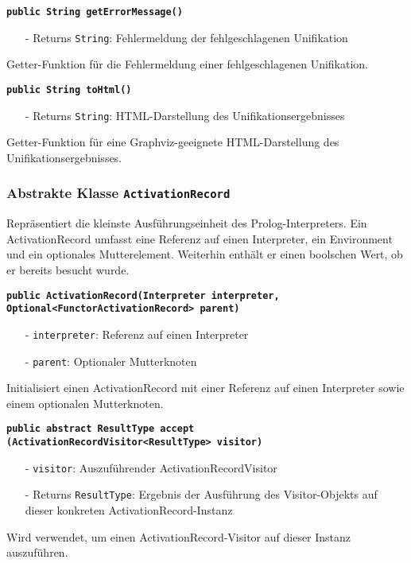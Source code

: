 \documentclass[parskip=full,11pt,twoside]{scrartcl}
\begin{document}
\textbf{\texttt{public String getErrorMessage()}}
\begin{itemize}[noitemsep]
	\item[-] Returns \texttt{String}: Fehlermeldung der fehlgeschlagenen Unifikation
\end{itemize}
Getter-Funktion für die Fehlermeldung einer fehlgeschlagenen Unifikation.

\textbf{\texttt{public String toHtml()}}
\begin{itemize}[noitemsep]
	\item[-] Returns \texttt{String}: HTML-Darstellung des Unifikationsergebnisses
\end{itemize}
Getter-Funktion für eine Graphviz-geeignete HTML-Darstellung des Unifikationsergebnisses.

\subsubsection{Abstrakte Klasse \texttt{ActivationRecord}}
Repräsentiert die kleinste Ausführungseinheit des Prolog-Interpreters. Ein ActivationRecord umfasst eine Referenz auf einen Interpreter, ein Environment und ein optionales Mutterelement. Weiterhin enthält er einen boolschen Wert, ob er bereits besucht wurde.

\textbf{\texttt{public ActivationRecord(Interpreter interpreter,\\Optional<FunctorActivationRecord> parent)}}
\begin{itemize}[noitemsep]
	\item[-] \texttt{interpreter}: Referenz auf einen Interpreter
	\item[-] \texttt{parent}: Optionaler Mutterknoten
\end{itemize}
Initialisiert einen ActivationRecord mit einer Referenz auf einen Interpreter sowie einem optionalen Mutterknoten.

\textbf{\texttt{public abstract ResultType accept\\(ActivationRecordVisitor<ResultType> visitor)}}
\begin{itemize}[noitemsep]
	\item[-] \texttt{visitor}: Auszuführender ActivationRecordVisitor
	\item[-] Returns \texttt{ResultType}: Ergebnis der Ausführung des Visitor-Objekts auf dieser konkreten ActivationRecord-Instanz
\end{itemize}
Wird verwendet, um einen ActivationRecord-Visitor auf dieser Instanz auszuführen.
\end{document}
